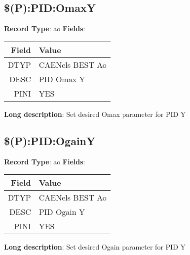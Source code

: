 \subsection{\$(P):PID:OmaxY}
\textbf{Record Type}: ao \newline \newline 
\textbf{Fields}: \newline 
\begin{tabularx}{0.7\linewidth}{|r|X|}
\hline Field & Value \\
\hline
\hline
DTYP & CAENels BEST Ao\\
\hline
DESC & PID Omax Y\\
\hline
PINI & YES\\
\hline
\end{tabularx}
\newline \newline \newline
\textbf{Long description}: \newline 
 Set desired Omax parameter for PID Y
\newline \newline

\subsection{\$(P):PID:OgainY}
\textbf{Record Type}: ao \newline \newline 
\textbf{Fields}: \newline 
\begin{tabularx}{0.7\linewidth}{|r|X|}
\hline Field & Value \\
\hline
\hline
DTYP & CAENels BEST Ao\\
\hline
DESC & PID Ogain Y\\
\hline
PINI & YES\\
\hline
\end{tabularx}
\newline \newline \newline
\textbf{Long description}: \newline 
 Set desired Ogain parameter for PID Y
\newline \newline

